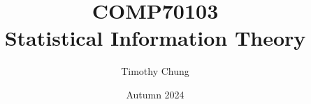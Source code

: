 \documentclass[a4paper,nofonts,notoc,oneside,openany,nobib]{tufte-book}
\title{COMP70103 \\Statistical Information Theory}
\date{Autumn 2024}
\author[Timothy Chung]{Timothy Chung}
\newcommand{\monthyear}{%
  \ifcase\month\or January\or February\or March\or April\or May\or June\or
  July\or August\or September\or October\or November\or
  December\fi\space\number\year
}
\newcommand{\openepigraph}[2]{%
  \begin{fullwidth}
  \sffamily\large
  \begin{doublespace}
  \noindent\allcaps{#1}\\%
  \noindent\allcaps{#2}%
  \end{doublespace}
  \end{fullwidth}
}
\newcommand{\blankpage}{\newpage\hbox{}\thispagestyle{empty}\newpage}
\begin{document}
\frontmatter
\RaggedRight




\begin{fullwidth}
  \begin{raggedright}
    \maketitle
  \end{raggedright}
\end{fullwidth}


\newpage
\begin{fullwidth}
  ~\vfill
  \thispagestyle{empty}
  \setlength{\parindent}{0pt}
  \setlength{\parskip}{\baselineskip}




\end{fullwidth}
\end{document}
